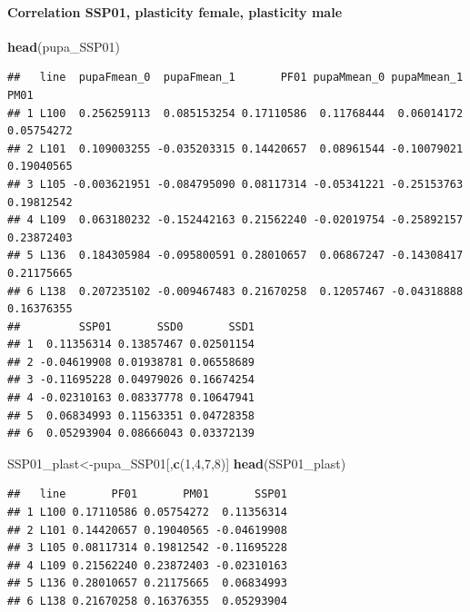\documentclass[
]{article}
\newenvironment{Shaded}{\begin{snugshade}}{\end{snugshade}}
\newcommand{\DecValTok}[1]{\textcolor[rgb]{0.00,0.00,0.81}{#1}}
\newcommand{\KeywordTok}[1]{\textcolor[rgb]{0.13,0.29,0.53}{\textbf{#1}}}
\newcommand{\NormalTok}[1]{#1}
\begin{document}
\hypertarget{correlation-ssp01-plasticity-female-plasticity-male}{%
\paragraph{Correlation SSP01, plasticity female, plasticity
male}\label{correlation-ssp01-plasticity-female-plasticity-male}}

\begin{Shaded}
\begin{Highlighting}[]
\KeywordTok{head}\NormalTok{(pupa_SSP01)}
\end{Highlighting}
\end{Shaded}

\begin{verbatim}
##   line  pupaFmean_0  pupaFmean_1       PF01 pupaMmean_0 pupaMmean_1       PM01
## 1 L100  0.256259113  0.085153254 0.17110586  0.11768444  0.06014172 0.05754272
## 2 L101  0.109003255 -0.035203315 0.14420657  0.08961544 -0.10079021 0.19040565
## 3 L105 -0.003621951 -0.084795090 0.08117314 -0.05341221 -0.25153763 0.19812542
## 4 L109  0.063180232 -0.152442163 0.21562240 -0.02019754 -0.25892157 0.23872403
## 5 L136  0.184305984 -0.095800591 0.28010657  0.06867247 -0.14308417 0.21175665
## 6 L138  0.207235102 -0.009467483 0.21670258  0.12057467 -0.04318888 0.16376355
##         SSP01       SSD0       SSD1
## 1  0.11356314 0.13857467 0.02501154
## 2 -0.04619908 0.01938781 0.06558689
## 3 -0.11695228 0.04979026 0.16674254
## 4 -0.02310163 0.08337778 0.10647941
## 5  0.06834993 0.11563351 0.04728358
## 6  0.05293904 0.08666043 0.03372139
\end{verbatim}

\begin{Shaded}
\begin{Highlighting}[]
\NormalTok{SSP01_plast<-pupa_SSP01[,}\KeywordTok{c}\NormalTok{(}\DecValTok{1}\NormalTok{,}\DecValTok{4}\NormalTok{,}\DecValTok{7}\NormalTok{,}\DecValTok{8}\NormalTok{)]}
\KeywordTok{head}\NormalTok{(SSP01_plast)}
\end{Highlighting}
\end{Shaded}

\begin{verbatim}
##   line       PF01       PM01       SSP01
## 1 L100 0.17110586 0.05754272  0.11356314
## 2 L101 0.14420657 0.19040565 -0.04619908
## 3 L105 0.08117314 0.19812542 -0.11695228
## 4 L109 0.21562240 0.23872403 -0.02310163
## 5 L136 0.28010657 0.21175665  0.06834993
## 6 L138 0.21670258 0.16376355  0.05293904
\end{verbatim}
\end{document}
